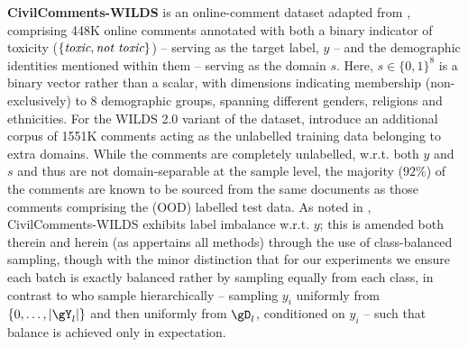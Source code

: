 \textbf{CivilComments-WILDS} is an online-comment dataset adapted from
\cite{borkan2019nuanced},  comprising 448K online comments
annotated with both a binary indicator of toxicity ($\{\mathrm{\emph{toxic}, \emph{not toxic}}\}$)
-- serving as the target label, $y$ -- and the demographic identities mentioned within them --
serving as the
domain $s$. 
Here, $s \in \{0, 1\}^8$ is a binary vector rather than a scalar, with dimensions 
indicating membership (non-exclusively) to 8 demographic groups, spanning different genders,
religions and ethnicities.
For the WILDS 2.0 variant of the dataset, \cite{SagWeiLeeGaoetal22} introduce an additional corpus
of 1551K
comments acting as the unlabelled training data belonging to extra domains.
While the comments are completely unlabelled, w.r.t. both $y$ and $s$ and thus are not
domain-separable at the sample level, the majority ($92\%$) of the comments are known to be sourced
from the same documents as those comments comprising the (OOD) labelled test data. 
As noted in \cite{SagWeiLeeGaoetal22}, CivilComments-WILDS exhibits label imbalance w.r.t. $y$;
this is amended both therein and herein (as appertains all methods) through the use of
class-balanced sampling, though with the minor distinction that for our experiments we ensure each
batch is exactly balanced rather by sampling equally from each class, in contrast to
\cite{SagWeiLeeGaoetal22} who sample hierarchically -- sampling $y_i$ uniformly from $\{0, \dots,
|\gY_l|\}$ and then uniformly from $\gD_l$, conditioned on $y_i$ -- such that balance is
achieved only in expectation.
